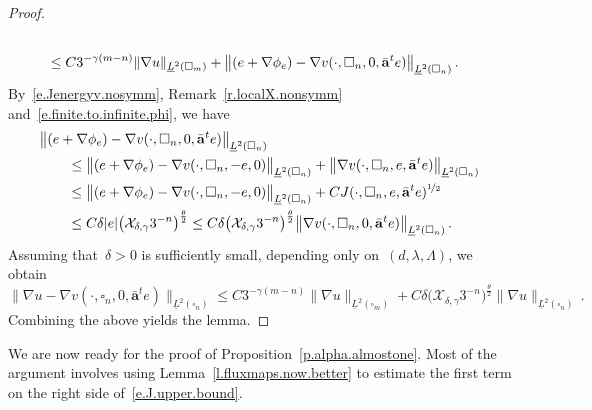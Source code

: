 \documentclass[11pt,twoside]{article} %
\let\oldsquare\square %
\renewcommand{\square}{\oldsquare}
\numberwithin{equation}{section}
\theoremstyle{definition}
\renewcommand{\a}{\mathbf{a}}
\newcommand{\ahom}{\bar{\a}}
\newcommand{\cu}{\square}
\newcommand{\X}{\mathcal{X}}
\begin{document}
\begin{proof}
\begin{align*}
\notag \\ & 
\leq 
C 3^{-\gamma (m-n)}
\| \nabla u \|_{\underline{L}^2(\cu_m)}
+
\bigl\| (e+\nabla \phi_e) - \nabla  v(\cdot,\cu_n,0,\ahom^t e)  \bigr\|_{\underline{L}^2(\cu_n)}  \,.
\end{align*}
By~\eqref{e.Jenergyv.nosymm}, Remark~\ref{r.localX.nonsymm} and~\eqref{e.finite.to.infinite.phi}, we have 
\begin{align*}
\lefteqn{ 
\bigl\| (e+\nabla \phi_e) - \nabla  v(\cdot,\cu_n,0,\ahom^t e)  \bigr\|_{\underline{L}^2(\cu_n)}
} \qquad & 
\notag \\ &
\leq 
\bigl\| (e+\nabla \phi_e) - \nabla  v(\cdot,\cu_n,-e,0)  \bigr\|_{\underline{L}^2(\cu_n)}
+
\bigl\| \nabla  v(\cdot,\cu_n,e,\ahom^t e)  \bigr\|_{\underline{L}^2(\cu_n)}
\notag \\ &
\leq 
\bigl\| (e+\nabla \phi_e) - \nabla  v(\cdot,\cu_n,-e,0)  \bigr\|_{\underline{L}^2(\cu_n)}
+
CJ(\cdot,\cu_n,e,\ahom^t e)^{\nicefrac12}
\notag \\ &
\leq 
C\delta|e|\bigl( \X_{\delta,\gamma} 3^{-n} \bigr)^{{\frac\theta 2}}
\leq 
C\delta\bigl( \X_{\delta,\gamma} 3^{-n} \bigr)^{{\frac\theta 2}} \bigl\| \nabla  v(\cdot,\cu_n,0,\ahom^te)  \bigr\|_{\underline{L}^2(\cu_n)}
\,.
\end{align*}
Assuming that~$\delta>0$ is sufficiently small, depending only on~$(d,\lambda,\Lambda)$, we obtain
\begin{equation*}
\bigl\| \nabla u - \nabla  v(\cdot,\cu_n,0,\ahom^t e)  \bigr\|_{\underline{L}^2(\cu_n)} 
\leq
C 3^{-\gamma (m-n)}
\| \nabla u \|_{\underline{L}^2(\cu_m)}
+ C\delta\bigl( \X_{\delta,\gamma} 3^{-n} \bigr)^{{\frac\theta 2}} 
\bigl\| \nabla u \bigr\|_{\underline{L}^2(\cu_n)} 
\,.
\end{equation*}
Combining the above yields the lemma. 
\end{proof}

We are now ready for the proof of Proposition~\ref{p.alpha.almostone}. Most of the argument involves using Lemma~\ref{l.fluxmaps.now.better} to estimate the first term on the right side of~\eqref{e.J.upper.bound}.
\end{document}
